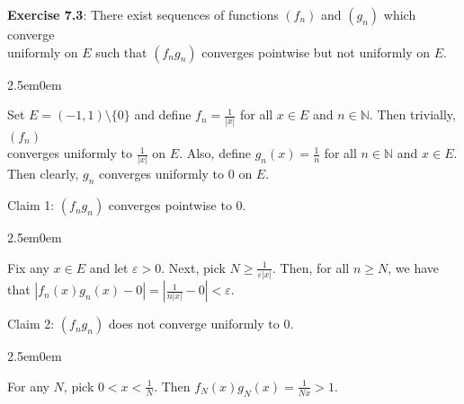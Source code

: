 \documentclass{book}
\newcommand{\pracTwo}{
   \color{Orange}%
   \fontsize{12}{14}\selectfont%
}
\newenvironment{myIndent}{%
   \begin{adjustwidth}{2.5em}{0em}%
}{%
   \end{adjustwidth}%
}
\newcommand{\mySepTwo}[1][.]{%
   {\noindent\color{#1}{\rule{6.5in}{0.5mm}}}\\%
}
\newcommand{\retTwo}{\hfill\bigbreak}
\begin{document}
\textbf{Exercise 7.3}: There exist sequences of functions $(f_n)$ and $(g_n)$ which converge\\ uniformly on $E$ such that $(f_ng_n)$ converges pointwise but not uniformly on $E$.\\ [-9pt]

{\begin{myIndent}\pracTwo
   Set $E = (-1, 1) \setminus \{0\}$ and define $f_n = \frac{1}{|x|}$ for all $x \in E$ and $n \in \mathbb{N}$. Then trivially, $(f_n)$\\ converges uniformly to $\frac{1}{|x|}$ on $E$. Also, define $g_n(x) = \frac{1}{n}$ for all $n \in \mathbb{N}$ and $x \in E$.\\ Then clearly, $g_n$ converges uniformly to $0$ on $E$.

   \newpage

   Claim 1: $(f_ng_n)$ converges pointwise to $0$.
   \begin{myIndent}
      Fix any $x \in E$ and let $\varepsilon > 0$. Next, pick $N \geq \frac{1}{\varepsilon|x|}$. Then, for all $n \geq N$, we have\\ that $|f_n(x)g_n(x) - 0| = |\frac{1}{n|x|} - 0| < \varepsilon$.\retTwo
   \end{myIndent}

   Claim 2: $(f_ng_n)$ does not converge uniformly to $0$.
   \begin{myIndent}
      For any $N$, pick $0 < x < \frac{1}{N}$. Then $f_N(x)g_N(x) = \frac{1}{Nx} > 1$.\retTwo
   \end{myIndent}
\end{myIndent}}

\mySepTwo
\end{document}
